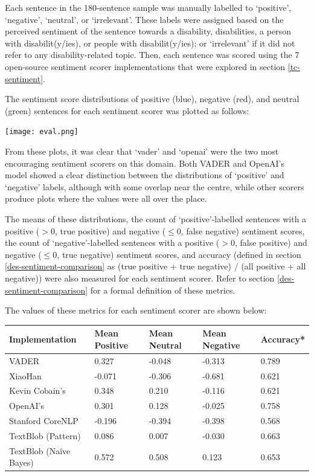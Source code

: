 \documentclass{report}
\begin{document}
Each sentence in the 180-sentence sample was manually labelled to `positive', `negative', `neutral', or `irrelevant'.
These labels were assigned based on the perceived sentiment of the sentence towards a disability, disabilities, a person with disabilit(y/ies), or people with disabilit(y/ies); or `irrelevant' if it did not refer to any disability-related topic.
Then, each sentence was scored using the 7 open-source sentiment scorer implementations that were explored in section \ref{tc-sentiment}.

The sentiment score distributions of positive (blue), negative (red), and neutral (green) sentences for each sentiment scorer was plotted as follows:

\noindent
\texttt{[image: eval.png]}

From these plots, it was clear that `vader' \cite{VADER} and `openai' \cite{OpenAI} were the two most encouraging sentiment scorers on this domain.
Both VADER and OpenAI's model showed a clear distinction between the distributions of `positive' and `negative' labels, although with some overlap near the centre, while other scorers produce plots where the values were all over the place.

The means of these distributions, the count of `positive'-labelled sentences with a positive ($>$0, true positive) and negative ($\le$0, false negative) sentiment scores, the count of `negative'-labelled sentences with a positive ($>$0, false positive) and negative ($\le$0, true negative) sentiment scores, and accuracy (defined in section \ref{des-sentiment-comparison} as (true positive + true negative) / (all positive + all negative)) were also measured for each sentiment scorer.
Refer to section \ref{des-sentiment-comparison} for a formal definition of these metrics.

The values of these metrics for each sentiment scorer are shown below: 

\vspace{0.5em}
\noindent
\begin{tabu} to \textwidth { | X[c] | X[c] | X[c] | X[c] | X[c] | }
	\hline
	Implementation & Mean Positive & Mean Neutral & Mean Negative & Accuracy* \\
	\hline
	VADER \cite{VADER} & 0.327 & -0.048 & -0.313 & 0.789 \\
	\hline
	XiaoHan \cite{kalchbrennerACL2014} & -0.071 & -0.306 & -0.681 & 0.621 \\
	\hline
	Kevin Cobain's \cite{kevincobain} & 0.348 & 0.210 & -0.116 & 0.621 \\
	\hline
	OpenAI's \cite{OpenAI} & 0.301 & 0.128 & -0.025 & 0.758 \\
	\hline
	Stanford CoreNLP \cite{StanfordNLP} & -0.196 & -0.394 & -0.398 & 0.568 \\
	\hline
	TextBlob \cite{textblob} (Pattern) & 0.086 & 0.007 & -0.030 & 0.663 \\
	\hline
	TextBlob \cite{textblob} (Na\"{i}ve Bayes) & 0.572 & 0.508 & 0.123 & 0.653 \\
	\hline
\end{tabu}
\end{document}
